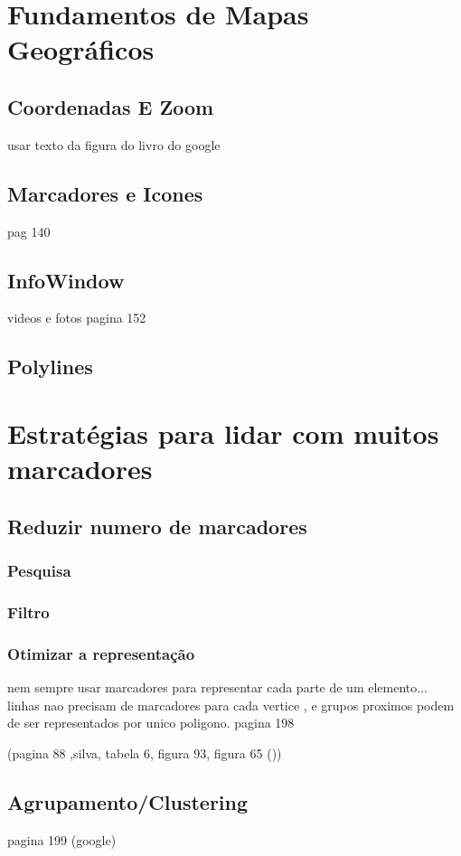 \section{Fundamentos de Mapas Geográficos}
	\subsection{Coordenadas E Zoom} usar texto da figura do livro do google
	\subsection{Marcadores e Icones} pag 140
	\subsection{InfoWindow} videos e fotos pagina 152
	\subsection{Polylines}

\section{Estratégias para lidar com muitos marcadores}
  \subsection{Reduzir numero de marcadores}
	\subsubsection{Pesquisa}
	\subsubsection{Filtro}
	\subsubsection{Otimizar a representação}
nem sempre usar marcadores para representar cada parte de um elemento... linhas nao precisam de marcadores para cada vertice , e grupos proximos podem de ser representados por unico poligono.
 pagina 198
 
 (pagina 88 ,silva, tabela 6, figura 93, figura 65 ())

  \subsection{Agrupamento/Clustering}
  pagina 199 (google)
